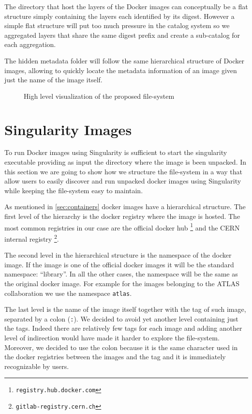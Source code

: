The directory that host the layers of the Docker images can conceptually be a
flat structure simply containing the layers each identified by its digest.
However a simple flat structure will put too much pressure in the catalog
system so we aggregated layers that share the same digest prefix and create
a sub-catalog for each aggregation.

The hidden metadata folder will follow the same hierarchical structure of
Docker images, allowing to quickly locate the metadata information of an image
given just the name of the image itself.

\begin{figure}
\caption{High level visualization of the proposed file-system}
\label{fig:high-level-fs}
\end{figure}


\section{Singularity Images}
\label{sec:methodology-singularity}

To run Docker images using Singularity is sufficient to start the singularity
executable providing as input the directory where the image is been unpacked.
In this section we are going to show how we structure the file-system in a way
that allow users to easily discover and run unpacked docker images using
Singularity while keeping the file-system easy to maintain.

As mentioned in \ref{sec:containers} docker images have
a hierarchical structure.  The first level of the hierarchy is the docker
registry where the image is hosted.  The most common registries in our case are
the official docker hub \footnote{\texttt{registry.hub.docker.com}} and the
CERN internal registry \footnote{\texttt{gitlab-registry.cern.ch}}.

The second level in the hierarchical structure is the namespace of the docker
image.  If the image is one of the official docker images it will be the
standard namespace: “library”.  In all the other cases, the namespace will be
the same as the original docker image.  For example for the images belonging to
the ATLAS collaboration we use the namespace \texttt{atlas}.

The last level is the name of the image itself together with the tag of such
image, separated by a colon (\texttt{:}).  We decided to avoid yet another
level containing just the tags.  Indeed there are relatively few tags for each
image and adding another level of indirection would have made it harder to
explore the file-system.  Moreover, we decided to use the colon because it is
the same character used in the docker registries between the images and the tag
and it is immediately recognizable by users.

